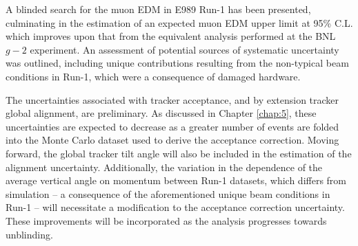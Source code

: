 A blinded search for the muon EDM in E989 Run-1 has been presented, culminating in the estimation of an expected muon EDM upper limit at 95\% C.L. which improves upon that from the equivalent analysis performed at the BNL $g-2$ experiment. An assessment of potential sources of systematic uncertainty was outlined, including unique contributions resulting from the non-typical beam conditions in Run-1, which were a consequence of damaged hardware. 

The uncertainties associated with tracker acceptance, and by extension tracker global alignment, are preliminary. As discussed in Chapter \ref{chap:5}, these uncertainties are expected to decrease as a greater number of events are folded into the Monte Carlo dataset used to derive the acceptance correction. Moving forward, the global tracker tilt angle will also be included in the estimation of the alignment uncertainty. Additionally, the variation in the dependence of the average vertical angle on momentum between Run-1 datasets, which differs from simulation -- a consequence of the aforementioned unique beam conditions in Run-1 -- will necessitate a modification to the acceptance correction uncertainty. These improvements will be incorporated as the analysis progresses towards unblinding.